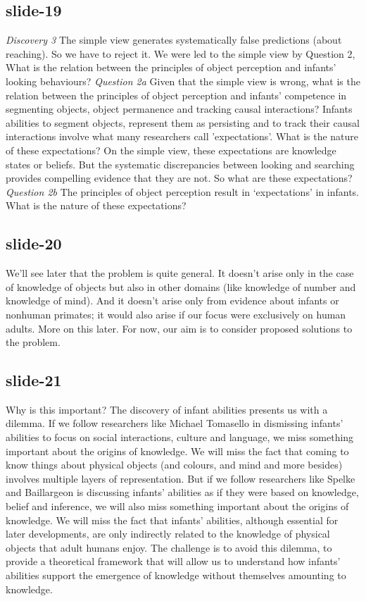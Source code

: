\documentclass[12pt,\papersize]{extarticle}
\begin{document}
\subsection{slide-19}
\emph{Discovery 3} The simple view generates systematically false predictions (about reaching).
So we have to reject it.
We were led to the simple view by Question 2, What is the relation between the principles of object perception and infants' looking behaviours?
\emph{Question 2a} Given that the simple view is wrong, what is the relation between the principles of object perception and infants’ competence in segmenting objects, object permanence and tracking causal interactions?
Infants abilities to segment objects, represent them as persisting and to track their causal interactions involve what many researchers call 'expectations'.
What is the nature of these expectations? On the simple view, these expectations are knowledge states or beliefs. But the systematic discrepancies between looking and searching provides compelling evidence that they are not.
So what are these expectations?
\emph{Question 2b} The principles of object perception result in ‘expectations’ in infants. What is the nature of these expectations?
 
 
\subsection{slide-20}
We'll see later that the problem is quite general.
It doesn't arise only in the case of knowledge of objects but also in other domains (like knowledge of number and knowledge of mind).
And it doesn't arise only from evidence about infants or nonhuman primates; it would also arise if our focus were exclusively on human adults.
More on this later.
For now, our aim is to consider proposed solutions to the problem.
 
 
\subsection{slide-21}
Why is this important?
The discovery of infant abilities presents us with a dilemma.
If we follow researchers like Michael Tomasello in dismissing infants' abilities to focus on social interactions, culture and language, we miss something important about the origins of knowledge. We will miss the fact that coming to know things about physical objects (and colours, and mind and more besides) involves multiple layers of representation.
But if we follow researchers like Spelke and Baillargeon is discussing infants' abilities as if they were based on knowledge, belief and inference, we will also miss something important about the origins of knowledge. We will miss the fact that infants' abilities, although essential for later developments, are only indirectly related to the knowledge of physical objects that adult humans enjoy.
The challenge is to avoid this dilemma, to provide a theoretical framework that will allow us to understand how infants' abilities support the emergence of knowledge without themselves amounting to knowledge.
 
\end{document}
